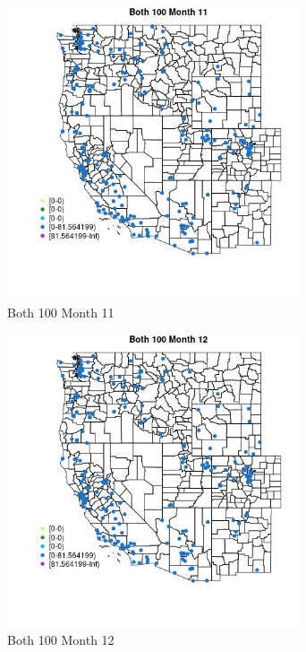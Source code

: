 \begin{figure} 
\centering  
\includegraphics[width=0.77\textwidth]{Code_Outputs/Report_ML_input_PM25_Step4_part_e_de_duplicated_aveswNAs_MapObsMo11Both_100.jpg} 
\caption{\label{fig:Report_ML_input_PM25_Step4_part_e_de_duplicated_aveswNAsMapObsMo11Both_100}Both 100 Month 11} 
\end{figure} 
 

\begin{figure} 
\centering  
\includegraphics[width=0.77\textwidth]{Code_Outputs/Report_ML_input_PM25_Step4_part_e_de_duplicated_aveswNAs_MapObsMo12Both_100.jpg} 
\caption{\label{fig:Report_ML_input_PM25_Step4_part_e_de_duplicated_aveswNAsMapObsMo12Both_100}Both 100 Month 12} 
\end{figure} 
 

